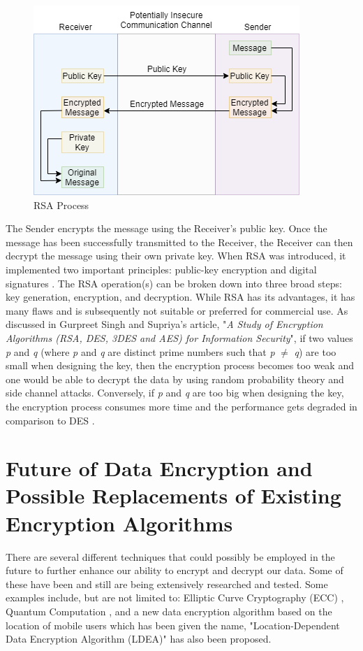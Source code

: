 \documentclass[journal]{IEEEtran}
\begin{document}
\newline
\begin{figure}[!h]
    \centering
    \includegraphics[scale=.4]{rsa}
    \caption{RSA Process}
    \label{fig:rsa}
\end{figure}

The Sender encrypts the message using the Receiver's public key. Once the message has been successfully transmitted to the Receiver, the Receiver can then decrypt the message using their own private key. When RSA was introduced, it implemented two important principles: public-key encryption and digital signatures \cite{rsa}. The RSA operation(s) can be broken down into three broad steps: key generation, encryption, and decryption. While RSA has its advantages, it has many flaws and is subsequently not suitable or preferred for commercial use. As discussed in Gurpreet Singh and Supriya's article, "\textit{A Study of Encryption Algorithms (RSA, DES, 3DES and AES) for Information Security}", if two values \textit{p} and \textit{q} (where \textit{p} and \textit{q} are distinct prime numbers such that \textit{p} $\neq$ \textit{q}) are too small when designing the key, then the encryption process becomes too weak and one would be able to decrypt the data by using random probability theory and side channel attacks. Conversely, if \textit{p} and \textit{q} are too big when designing the key, the encryption process consumes more time and the performance gets degraded in comparison to DES \cite{encryption_study}. 

\section{\textbf{Future of Data Encryption and Possible Replacements of Existing Encryption Algorithms}}
There are several different techniques that could possibly be employed in the future to further enhance our ability to encrypt and decrypt our data. Some of these have been and still are being extensively researched and tested. Some examples include, but are not limited to: Elliptic Curve Cryptography (ECC) \cite{ecc}, Quantum Computation \cite{quantum_computing_encryption}, and a new data encryption algorithm based on the location of mobile users which has been given the name, "Location-Dependent Data Encryption Algorithm (LDEA)" \cite{new_encryption_mobile} has also been proposed.
\end{document}
